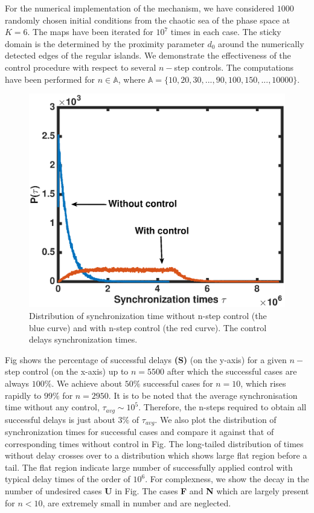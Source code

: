 \documentclass[reprint,superscriptaddress,amsmath,amssymb,aps,pre]{revtex4-1}
\begin{document}
For the numerical implementation of the mechanism, we have considered $1000$ randomly chosen initial conditions from the chaotic sea of the phase space at $K = 6$. The maps have been iterated for $10^7$ times in each case.  The sticky domain is the determined by the proximity parameter $d_0$ around the numerically detected edges of the regular islands. We demonstrate the effectiveness of the control procedure  with respect to several $n-$step controls. The computations have been performed for $n \in \mathbb{A}$, where $\mathbb{A} = \{10, 20,30,...,90, 100, 150, ... ,10 000\}$.  

\begin{figure}[t]
	\includegraphics[scale=0.45]{Sync_time_dist.eps}
	\caption{\label{fig:Sync_time_dist}\footnotesize Distribution of 
		synchronization time without n-step control (the blue curve) and with n-step 
		control (the red curve). The control delays synchronization times. }
\end{figure}


Fig  shows the percentage of successful delays \textbf{(S)} (on the y-axis) for a given $n-$step control (on the x-axis) up to $n = 5500$ after which the successful cases are always $100\%$.  We achieve about $50\%$ successful cases for $n = 10$, which rises rapidly to $99\%$ for $n = 2950$. It is to be noted that the average synchronisation time without any control, $\tau_{avg} \sim 10^5$. Therefore, the n-steps required to obtain all successful delays is just about $3\%$ of $\tau_{avg}$. We also plot the distribution of synchronization times for successful cases and compare it against that of corresponding times without control in Fig. The long-tailed distribution of times without delay crosses over to a distribution which shows large flat region before a tail. The flat region indicate large number of successfully applied control with typical delay times of the order of $10^6$. For complexness, we show the decay in the number of undesired cases \textbf{U} in Fig.  The cases \textbf{F} and \textbf{N} which are largely present for $n<10$, are extremely small in number and are neglected. 
\end{document}
